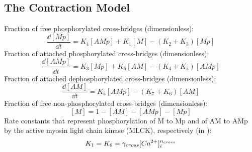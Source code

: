 \documentclass[fleqn]{report}
\numberwithin{equation}{section}
\numberwithin{equation}{section}
\begin{document}
	\subsection{The Contraction Model}
	Fraction of free phosphorylated cross-bridges (dimensionless):
	\begin{equation} \label{eq:dMpdt}
	\frac{\dd[Mp]}{\dd t} = K_{4}[AMp] +K_{1} [M] - ( K_{2} + K_{3} ) [Mp]
	\end{equation}
	Fraction of attached phosphorylated cross-bridges (dimensionless):
	\begin{equation} \label{eq:dAMpdt}
	\frac{\dd[AMp]}{\dd t} =K_{3} [Mp] + K_{6} [AM] - ( K_{4} + K_{5} )[AMp]
	\end{equation} 
	Fraction of attached dephosphorylated cross-bridges (dimensionless):
	\begin{equation} \label{eq:dAMdt}
	\frac{\dd[AM]}{\dd t} = K_{5} [AMp]-(K_{7}+K_{6})[AM]
	\end{equation}
	Fraction of free non-phosphorylated cross-bridges (dimensionless):
	\begin{equation} \label{eq:dMdt}
	[M]=1-[AM]-[AMp]-[Mp]
	\end{equation}
	Rate constants that represent phosphorylation of M to Mp and of AM to AMp by the active myosin light chain kinase (MLCK), respectively (in \pers):
	\begin{equation} \label{eq:gamma}
	K_{1} = K_{6} = \gamma_{cross} [Ca^{2+}]_{i} ^{n_{cross}}
	\end{equation}
\end{document}
